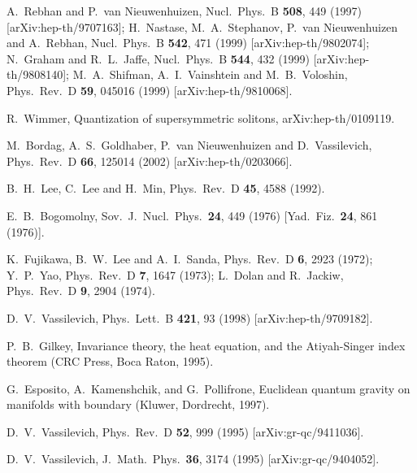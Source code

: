\documentclass[a4paper,12pt]{article}
\begin{document}
\begin{thebibliography}{99}
A.~Rebhan and P.~van Nieuwenhuizen,
Nucl.\ Phys.\ B {\bf 508}, 449 (1997)
[arXiv:hep-th/9707163];
H.~Nastase, M.~A.~Stephanov, P.~van Nieuwenhuizen and A.~Rebhan,
Nucl.\ Phys.\ B {\bf 542}, 471 (1999)
[arXiv:hep-th/9802074];
N.~Graham and R.~L.~Jaffe,
Nucl.\ Phys.\ B {\bf 544}, 432 (1999)
[arXiv:hep-th/9808140];
M.~A.~Shifman, A.~I.~Vainshtein and M.~B.~Voloshin,
Phys.\ Rev.\ D {\bf 59}, 045016 (1999)
[arXiv:hep-th/9810068].

R.~Wimmer,
Quantization of supersymmetric solitons,
arXiv:hep-th/0109119.

M.~Bordag, A.~S.~Goldhaber, P.~van Nieuwenhuizen and D.~Vassilevich,
Phys.\ Rev.\ D {\bf 66}, 125014 (2002)
[arXiv:hep-th/0203066].

B.~H.~Lee, C.~Lee and H.~Min,
Phys.\ Rev.\ D {\bf 45}, 4588 (1992).

E.~B.~Bogomolny,
Sov.\ J.\ Nucl.\ Phys.\  {\bf 24}, 449 (1976)
[Yad.\ Fiz.\  {\bf 24}, 861 (1976)].

K.~Fujikawa, B.~W.~Lee and A.~I.~Sanda,
Phys.\ Rev.\ D {\bf 6}, 2923 (1972);
Y.~P.~Yao,
Phys.\ Rev.\ D {\bf 7}, 1647 (1973);
L.~Dolan and R.~Jackiw,
Phys.\ Rev.\ D {\bf 9}, 2904 (1974).

D.~V.~Vassilevich,
Phys.\ Lett.\ B {\bf 421}, 93 (1998)
[arXiv:hep-th/9709182].

P.~B.~Gilkey, Invariance theory, the heat equation, and the Atiyah-Singer
index theorem (CRC Press, Boca Raton, 1995).

G.~Esposito, A.~Kamenshchik, and G.~Pollifrone, Euclidean quantum gravity on
manifolds with boundary (Kluwer, Dordrecht, 1997).

D.~V.~Vassilevich,
Phys.\ Rev.\ D {\bf 52}, 999 (1995)
[arXiv:gr-qc/9411036].

D.~V.~Vassilevich,
J.\ Math.\ Phys.\  {\bf 36}, 3174 (1995)
[arXiv:gr-qc/9404052].


\end{thebibliography}
\end{document}
